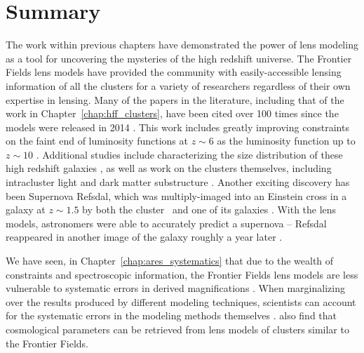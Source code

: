 \section{Summary}

The work within previous chapters have demonstrated the power of lens modeling as a tool for uncovering the mysteries of the high redshift universe. The Frontier Fields lens models have provided the community with easily-accessible lensing information of all the clusters for a variety of researchers regardless of their own expertise in lensing. Many of the papers in the literature, including that of the work in Chapter~\ref{chap:hff_clusters}, have been cited over 100 times since the models were released in 2014 \citep{Johnson:2014tg,Richard:2014gf}. This work includes greatly improving constraints on the faint end of luminosity functions at $z\sim6$ \citep {Bouwens:2017df} as the luminosity function up to $z\sim10$ \cite{Ishigaki:2017le,Ishigaki:2015cs,McLeod:2016xw}. Additional studies include characterizing the size distribution of these high redshift galaxies \citep{Kawamata:2017bc, Bouwens:2017to,Kawamata:2015ax}, as well as work on the clusters themselves, including intracluster light \citep{Montes:2018hs,Montes:2014jx,Morishita:2017zf} and dark matter substructure \citep{Natarajan:2017qp,Jauzac:2016dn,Mohammed:2016bk,Grillo:2016jk}. Another exciting discovery has been Supernova Refsdal, which was multiply-imaged into an Einstein cross in a galaxy at $z\sim1.5$ by both the cluster \MACSeleven\ and one of its galaxies \citep{Kelly:2016az,Rodney:2016sf,Kelly:2015pj}. With the lens models, astronomers were able to accurately predict a supernova \citep{Treu:2016lr,Jauzac:2016ux,Sharon:2015xe,Oguri:2015hb} -- Refsdal reappeared in another image of the galaxy roughly a year later \citep{Kelly:2016hw}.

We have seen, in Chapter~\ref{chap:ares_systematics} that due to the wealth of constraints and spectroscopic information, the Frontier Fields lens models are less vulnerable to systematic errors in derived magnifications \citep{Johnson:2016rt}. When marginalizing over the results produced by different modeling techniques, scientists can account for the systematic errors in the modeling methods themselves \citep{Meneghetti:2016xe}. \citet{Acebron:2017wl} also find that cosmological parameters can be retrieved from lens models of clusters similar to the Frontier Fields.

